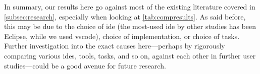 \documentclass[../thesis]{subfiles}
\begin{document}
In summary, our results here go against most of the existing literature covered in \cref{subsec:research}, especially when looking at \cref{tab:compresults}.
As said before, this may be due to the choice of \gls{ide} (the most-used \gls{ide} by other studies has been Eclipse, while we used \gls{vscode}), choice of  implementation, or choice of tasks.
Further investigation into the exact causes here---perhaps by rigorously comparing various \glspl{ide},  tools, tasks, and so on, against each other in further user studies---could be a good avenue for future research.

\end{document}
